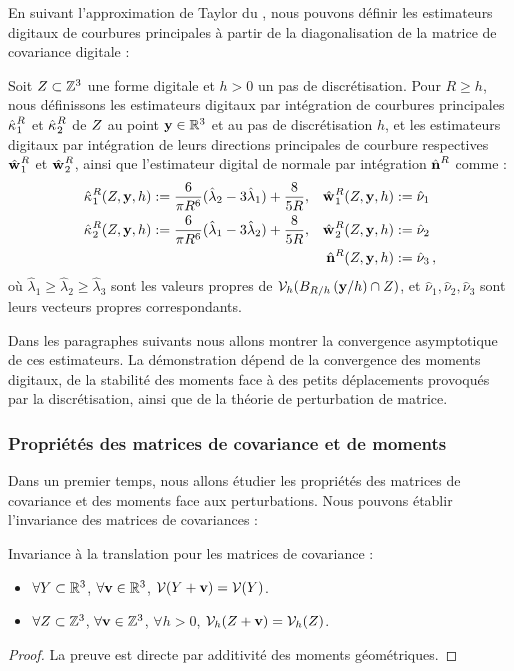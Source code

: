%
En suivant l'approximation de Taylor du , nous pouvons
définir les estimateurs digitaux de courbures principales à partir de la
diagonalisation de la matrice de covariance digitale :
%
\begin{definition}
  \label{def:principal-curv-estimators}
%
  Soit $Z \subset \mathbb{Z}^3$ une forme digitale et $h > 0$ un pas de
  discrétisation. Pour $R \ge h$, nous définissons les estimateurs digitaux par
  intégration de courbures principales $\hat{\kappa_{}}_{1}^{R}$ et
  $\hat{\kappa_{}}_{2}^{R}$ de $Z$ au point $\mathbf{y} \in \mathbb{R}^3$ et au pas de
  discrétisation $h$, et les estimateurs digitaux par intégration de leurs
  directions principales de courbure respectives $\hat{\mathbf{w}_{}}_{1}^{R}$ et
  $\hat{\mathbf{w}_{}}_{2}^{R}$, ainsi que l'estimateur digital de normale par intégration
  $\hat{\mathbf{n}{}}^{R}$ comme :
%
\begin{align}
  \hat{\kappa_{}}_{1}^{R}(Z,\mathbf{y},h)  &:= \frac{6}{\pi R^6}(\hat{\lambda}_2 - 3\hat{\lambda}_1) + \frac{8}{5R},
  &\hat{\mathbf{w}_{}}_{1}^{R}(Z,\mathbf{y},h) &:= \hat{\nu}_1 \\
  \hat{\kappa_{}}_{2}^{R}(Z,\mathbf{y},h) &:= \frac{6}{\pi R^6}(\hat{\lambda}_1 - 3\hat{\lambda}_2) + \frac{8}{5R},
  &\hat{\mathbf{w}_{}}_{2}^{R}(Z,\mathbf{y},h) &:= \hat{\nu}_2\\
  & &\hat{\mathbf{n}{}}^{R}(Z,\mathbf{y},h) &:=\hat{\nu}_3\,,
\end{align}
%
où $\hat{\lambda}_1 \ge \hat{\lambda}_2 \ge \hat{\lambda}_3$ sont les valeurs
propres de $\mathcal{V}_{h}(B_{R/h}\left(\mathbf{y} / h\right) \cap Z)$, et $\hat{\nu}_1,
\hat{\nu}_2, \hat{\nu}_3$ sont leurs vecteurs propres correspondants.
%
\end{definition}
%
Dans les paragraphes suivants nous allons montrer la convergence asymptotique de
ces estimateurs. La démonstration dépend de la convergence des moments digitaux,
de la stabilité des moments face à des petits déplacements provoqués par la
discrétisation, ainsi que de la théorie de perturbation de matrice.
%
\subsubsection{Propriétés des matrices de covariance et de moments}

Dans un premier temps, nous allons étudier les propriétés des matrices de
covariance et des moments face aux perturbations. Nous pouvons
établir l'invariance des matrices de covariances :
%
\begin{lemma} \label{lem:covariance-translation-invariant}
%
  Invariance à la translation pour les matrices de covariance :
%
  \begin{itemize}
    \item $\forall Y \subset \mathbb{R}^3$, $\forall \mathbf{v} \in \mathbb{R}^3$, $\mathcal{V}(Y + \mathbf{v}) = \mathcal{V}(Y)$.
    \item $\forall Z \subset \mathbb{Z}^3$, $\forall \mathbf{v} \in \mathbb{Z}^3$, $\forall h > 0$, $\mathcal{V}_{h}(Z + \mathbf{v}) = \mathcal{V}_{h}(Z)$.
  \end{itemize}
%
\end{lemma}
\begin{proof}
  La preuve est directe par additivité des moments géométriques.
\end{proof}

